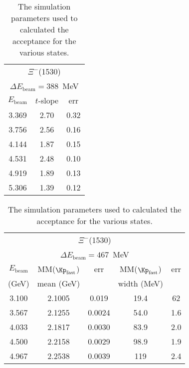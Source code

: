 \begin{table}[bh]
\begin{minipage}{\columnwidth}
\begin{center}
\begin{singlespacing}

\caption[Simulation Trends]{\label{tab:sim.xi1530.tslope}The simulation parameters used to calculated the acceptance for the various states.}
\begin{tabular}{ccc}
\hline \hline
\multicolumn{3}{c}{$\Xi^-$(1530)} \\
\multicolumn{3}{c}{$\Delta E_\mathrm{beam} = 388$~MeV} \\
\hline
$E_\mathrm{beam}$ & $t$-slope & err \\
\hline

3.369 & 2.70 & 0.32 \\
3.756 & 2.56 & 0.16 \\
4.144 & 1.87 & 0.15 \\
4.531 & 2.48 & 0.10 \\
4.919 & 1.89 & 0.13 \\
5.306 & 1.39 & 0.12 \\

\hline \hline
\end{tabular}
\end{singlespacing}
\end{center}
\end{minipage}
\end{table}

\begin{table}[bh]
\begin{minipage}{\columnwidth}
\begin{center}
\begin{singlespacing}

\caption[Simulation Trends]{\label{tab:sim.xi1530.y}The simulation parameters used to calculated the acceptance for the various states.}
\begin{tabular}{ccccc}
\hline \hline
\multicolumn{5}{c}{$\Xi^-$(1530)} \\
\multicolumn{5}{c}{$\Delta E_\mathrm{beam} = 467$~MeV} \\
\hline
$E_\mathrm{beam}$ & MM($\Kp_\mathrm{fast}$) & err & MM($\Kp_\mathrm{fast}$) & err \\
(GeV) & mean (GeV) & & width (MeV) & \\
\hline

3.100 & 2.1005 & 0.019 & 19.4 & 62 \\
3.567 & 2.1255 & 0.0024 & 54.0 & 1.6 \\
4.033 & 2.1817 & 0.0030 & 83.9 & 2.0 \\
4.500 & 2.2158 & 0.0029 & 98.9 & 1.9 \\
4.967 & 2.2538 & 0.0039 & 119 & 2.4 \\

\hline \hline
\end{tabular}

\end{singlespacing}
\end{center}
\end{minipage}
\end{table}
\vspace{20pt}

